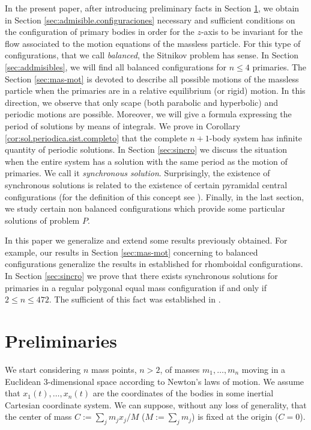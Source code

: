 \documentclass[smallcondensed]{svjour3}
\begin{document}
In the present paper, after introducing preliminary facts in Section \ref{sec:pre},   we
obtain in Section \ref{sec:admisible.configuraciones} necessary and sufficient conditions on the configuration of primary bodies in order for the $z$-axis to be invariant for the flow associated to the motion equations of the massless particle. For this type of configurations, that we call \emph{balanced}, the Sitnikov problem has sense.  In Section \ref{sec:addmisibles}, we will find all balanced configurations for $n\leq 4$ primaries.  The Section \ref{sec:mas-mot} is devoted to describe all possible motions of the massless particle when the primaries are in a relative equilibrium (or rigid) motion. In this direction, we observe that only scape (both parabolic and hyperbolic) and periodic motions are possible. Moreover, we will give a formula expressing the period of solutions  by means of integrals.  We prove in Corollary \ref{cor:sol.periodica.sist.completo} that the complete $n+1$-body system has  infinite quantity of periodic solutions. In Section  \ref{sec:sincro} we discuss the
situation when the entire system has a solution with the same period as the motion of primaries. We call it \emph{synchronous solution}. Surprisingly, the existence of synchronous solutions is related to the existence of certain pyramidal central configurations (for the definition of this concept see \cite{fayccal1996classification,faycaltesis,ouyang2004pyramidal}). Finally, in the last section, we study certain non balanced configurations which provide some particular solutions of problem $P$.

In this paper we generalize and extend some results previously obtained. For example, our results in Section \ref{sec:mas-mot} concerning to balanced configurations   generalize the results  in \cite{marchesin2013spatial} established for rhomboidal configurations. In Section \ref{sec:sincro} we prove that there exists synchronous solutions for primaries in a regular polygonal equal mass configuration if and only if $2\leq n\leq 472$. The sufficient of this fact was established in \cite{li2013characterization}.


\section{Preliminaries}\label{sec:pre}

We start considering $n$  mass points, $n>2$, of masses $m_1,\ldots,m_n$ moving in a Euclidean 3-dimensional space according to Newton's laws of motion. We assume that $x_1(t),\ldots,x_n(t)$ are the coordinates of the bodies in some inertial Cartesian coordinate system.  We can suppose, without any loss of generality, that the center of mass   $C:=\sum_jm_jx_j/M$ ($M:=\sum_j m_j$) is fixed at the origin ($C=0$).
\end{document}
